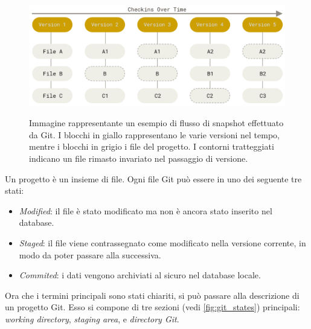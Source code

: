 \documentclass[./main.tex]{subfiles}
\begin{document}
\begin{figure}[!ht]
\noindent\begin{minipage}{0.5\textwidth}
\vspace{1cm}
\includegraphics[width=\textwidth]{images/git_snapshot.pdf}
\captionsetup{font=small, hypcap=false}
\label{fig:git_snapshot}
\end{minipage}
\hspace{0.05\textwidth}
\begin{minipage}{0.4\textwidth}
\begin{small}
Immagine rappresentante un esempio di flusso di snapshot effettuato da Git. I blocchi in giallo rappresentano le varie versioni nel tempo, mentre i blocchi in grigio i file del progetto. I contorni tratteggiati indicano un file rimasto invariato nel passaggio di versione.
\end{small}
\end{minipage}
\vspace{0.25cm}
\end{figure}

Un progetto è un insieme di file. Ogni file Git può essere in uno dei seguente tre stati:

\begin{itemize}
    \item \textit{Modified}: il file è stato modificato ma non è ancora stato inserito nel database.
    \item \textit{Staged}: il file viene contrassegnato come modificato nella versione corrente, in modo da poter passare alla successiva.
    \item \textit{Commited}: i dati vengono archiviati al sicuro nel database locale.
\end{itemize}

Ora che i termini principali sono stati chiariti, si può passare alla descrizione di un progetto Git. Esso si compone di tre sezioni (vedi \autoref{fig:git_states}) principali: \textit{working directory}, \textit{staging area}, e \textit{directory Git}.\par
\end{document}

